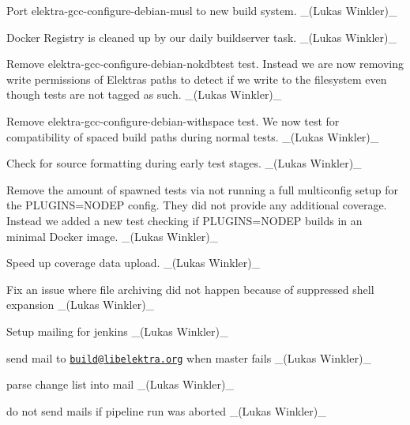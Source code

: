 \begin{DoxyItemize}
\item Port {\ttfamily elektra-\/gcc-\/configure-\/debian-\/musl} to new build system. \+\_\+(\+Lukas Winkler)\+\_\+
\item Docker Registry is cleaned up by our daily buildserver task. \+\_\+(\+Lukas Winkler)\+\_\+
\item Remove {\ttfamily elektra-\/gcc-\/configure-\/debian-\/nokdbtest} test. Instead we are now removing write permissions of Elektra\textquotesingle{}s paths to detect if we write to the filesystem even though tests are not tagged as such. \+\_\+(\+Lukas Winkler)\+\_\+
\item Remove {\ttfamily elektra-\/gcc-\/configure-\/debian-\/withspace} test. We now test for compatibility of spaced build paths during normal tests. \+\_\+(\+Lukas Winkler)\+\_\+
\item Check for source formatting during early test stages. \+\_\+(\+Lukas Winkler)\+\_\+
\item Remove the amount of spawned tests via not running a full multiconfig setup for the {\ttfamily P\+L\+U\+G\+I\+NS=N\+O\+D\+EP} config. They did not provide any additional coverage. Instead we added a new test checking if {\ttfamily P\+L\+U\+G\+I\+NS=N\+O\+D\+EP} builds in an minimal Docker image. \+\_\+(\+Lukas Winkler)\+\_\+
\item Speed up coverage data upload. \+\_\+(\+Lukas Winkler)\+\_\+
\item Fix an issue where file archiving did not happen because of suppressed shell expansion \+\_\+(\+Lukas Winkler)\+\_\+
\item Setup mailing for jenkins \+\_\+(\+Lukas Winkler)\+\_\+
\begin{DoxyItemize}
\item send mail to \href{mailto:build@libelektra.org}{\tt build@libelektra.\+org} when {\ttfamily master} fails \+\_\+(\+Lukas Winkler)\+\_\+
\item parse change list into mail \+\_\+(\+Lukas Winkler)\+\_\+
\item do not send mails if pipeline run was aborted \+\_\+(\+Lukas Winkler)\+\_\+
\end{DoxyItemize}
\end{DoxyItemize}


